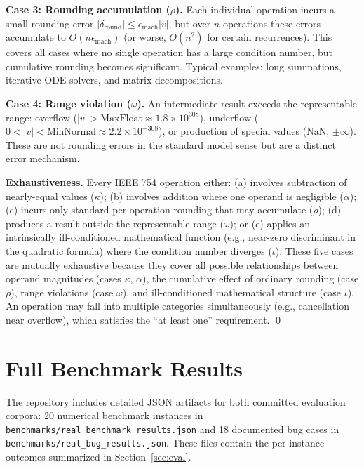 \documentclass[11pt]{article}
\begin{document}
\textbf{Case 3: Rounding accumulation ($\rho$).} Each individual operation incurs a small rounding error $|\delta_{\text{round}}| \leq \epsilon_{\text{mach}} |v|$, but over $n$ operations these errors accumulate to $O(n \epsilon_{\text{mach}})$ (or worse, $O(n^2)$ for certain recurrences). This covers all cases where no single operation has a large condition number, but cumulative rounding becomes significant. Typical examples: long summations, iterative ODE solvers, and matrix decompositions.

\textbf{Case 4: Range violation ($\omega$).} An intermediate result exceeds the representable range: overflow ($|v| > \text{MaxFloat} \approx 1.8 \times 10^{308}$), underflow ($0 < |v| < \text{MinNormal} \approx 2.2 \times 10^{-308}$), or production of special values (NaN, $\pm\infty$). These are not rounding errors in the standard model sense but are a distinct error mechanism.

\textbf{Exhaustiveness.} Every IEEE 754 operation either: (a) involves subtraction of nearly-equal values ($\kappa$); (b) involves addition where one operand is negligible ($\alpha$); (c) incurs only standard per-operation rounding that may accumulate ($\rho$); (d) produces a result outside the representable range ($\omega$); or (e) applies an intrinsically ill-conditioned mathematical function (e.g., near-zero discriminant in the quadratic formula) where the condition number diverges ($\iota$). These five cases are mutually exhaustive because they cover all possible relationships between operand magnitudes (cases $\kappa$, $\alpha$), the cumulative effect of ordinary rounding (case $\rho$), range violations (case $\omega$), and ill-conditioned mathematical structure (case $\iota$). An operation may fall into multiple categories simultaneously (e.g., cancellation near overflow), which satisfies the ``at least one'' requirement. \qed

\section{Full Benchmark Results}
The repository includes detailed JSON artifacts for both committed evaluation
corpora: 20 numerical benchmark instances in
\texttt{benchmarks/real\_benchmark\_results.json} and 18 documented bug cases in
\texttt{benchmarks/real\_bug\_results.json}. These files contain the
per-instance outcomes summarized in Section~\ref{sec:eval}.
\end{document}
